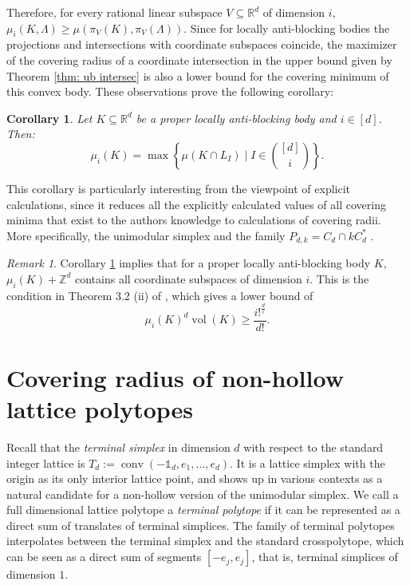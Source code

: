 \documentclass{amsart}
\newtheorem{corollary}[theorem]{Corollary}
\theoremstyle{definition}
\theoremstyle{remark}
\newtheorem{remark}[theorem]{Remark}
\newcommand{\R}{\mathbb{R}}
\newcommand{\Z}{\mathbb{Z}}
\begin{document}
Therefore, for every rational linear subspace $V\subseteq \R^d$ of dimension $i$, $\mu_i(K, \Lambda)\geqslant \mu(\pi_V(K), \pi_V(\Lambda))$. Since for locally anti-blocking bodies the projections and intersections with coordinate subspaces coincide,  the maximizer of the covering radius of a coordinate intersection in the upper bound given by Theorem \ref{thm: ub intersec} is also a lower bound for the covering minimum of this convex body. These observations prove the following corollary:


\begin{corollary}\label{cor: locally anti-blocking}
Let $K\subseteq \R^d$ be a proper locally anti-blocking body and $i\in [d]$. Then:
$$\mu_i(K)= \max\left\{ \mu(K\cap L_I)\;| \; I\in {[d]\choose i} \right\}.$$
\end{corollary}

This corollary is particularly interesting from the viewpoint of explicit calculations, since it reduces all the explicitly calculated values of all covering minima that exist to the authors knowledge to calculations of covering radii. More specifically, the unimodular simplex \cite{KannanLovasz} and the family $P_{d,k}=C_d\cap kC_d^*$ \cite{MerinoSchymura}.

\begin{remark}
Corollary \ref{cor: locally anti-blocking} implies that for a proper locally anti-blocking body $K$, $\mu_i(K)+\Z^d$ contains all coordinate subspaces of dimension $i$. 
This is the condition in Theorem 3.2 (ii) of \cite{MerinoSchymura}, which gives a lower bound of
$$\mu_i(K)^d\operatorname{vol}(K)\geqslant \frac{{i!}^{\frac{d}{i}}}{d!}.$$
\end{remark}






\section{Covering radius of non-hollow lattice polytopes}\label{sec: conjectures}

Recall that the \textit{terminal simplex} in dimension $d$ with respect to the standard integer lattice is $T_d:=\operatorname{conv}(-\mathbb{1}_d, e_1,\dots, e_d)$. It is a lattice simplex with the origin as its only interior lattice point, and shows up in various contexts as a natural candidate for a non-hollow version of the unimodular simplex.  We call a full dimensional lattice polytope a \textit{terminal polytope} if it can be represented as a direct sum of translates of terminal simplices. The family of terminal polytopes interpolates between the terminal simplex and the standard crosspolytope, which can be seen as a direct sum of segments $[-e_j, e_j] $, that is, terminal simplices of dimension $1$.
 
\end{document}
